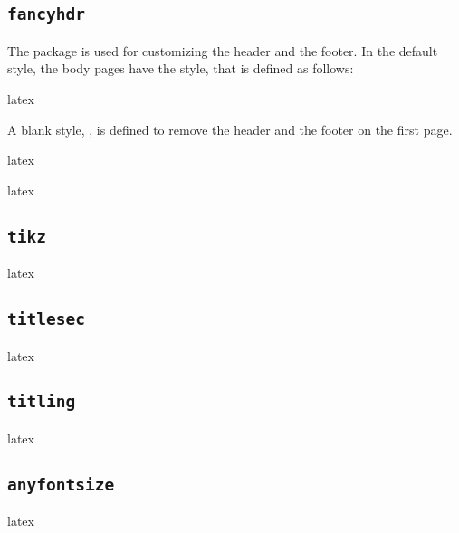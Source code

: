 \documentclass{report}
\begin{document}
\subsection{\texttt{fancyhdr}}

The  package is used for customizing the header and the footer.
In the default style, the body pages have the  style, that is defined as follows:

\begin{imtaCode}{latex}
\pagestyle{fancy}
\fancyhead{}
\fancyfoot{}
\fancyhead[L]{\thetitle}
\fancyhead[R]{\imtaTheAuthorShort}
\fancyfoot[C]{\thepage}
\end{imtaCode}

A blank style, , is defined to remove the header and the footer on the first page.

\begin{imtaCode}{latex}
\end{imtaCode}


\begin{imtaCode}{latex}
\RequirePackage{fancyhdr}
\end{imtaCode}

\subsection{\texttt{tikz}}
\begin{imtaCode}{latex}
\RequirePackage{tikz}
\end{imtaCode}

\subsection{\texttt{titlesec}}
\begin{imtaCode}{latex}
\RequirePackage{titlesec}
\end{imtaCode}

\subsection{\texttt{titling}}
\begin{imtaCode}{latex}
\RequirePackage{titling}
\end{imtaCode}

\subsection{\texttt{anyfontsize}}
\begin{imtaCode}{latex}
\RequirePackage{anyfontsize}
\end{imtaCode}
\end{document}
